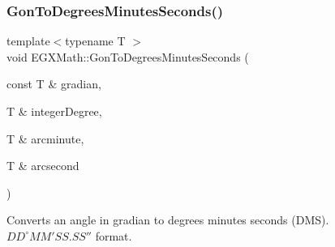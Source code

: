 \subsubsection{\texorpdfstring{Gon\+To\+Degrees\+Minutes\+Seconds()}{GonToDegreesMinutesSeconds()}}
{\footnotesize\ttfamily template$<$typename T $>$ \\
void E\+G\+X\+Math\+::\+Gon\+To\+Degrees\+Minutes\+Seconds (\begin{DoxyParamCaption}\item[{const T \&}]{gradian,  }\item[{T \&}]{integer\+Degree,  }\item[{T \&}]{arcminute,  }\item[{T \&}]{arcsecond }\end{DoxyParamCaption})}



Converts an angle in gradian to degrees minutes seconds (D\+MS). ${DD}^{\circ}{MM}'{SS.SS}''$ format. 



